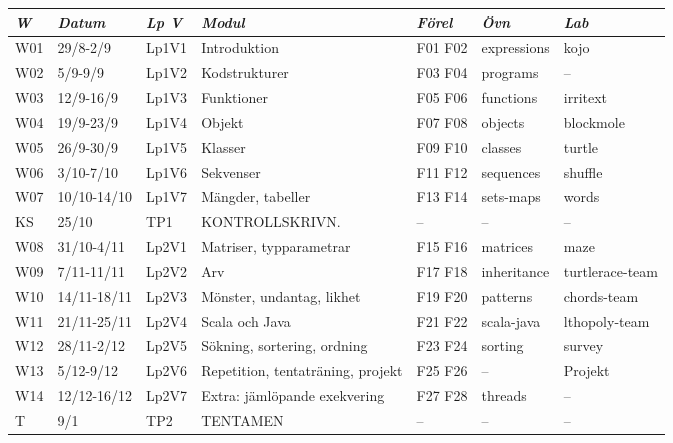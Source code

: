\begin{tabular}{l|l|l|l|l|l|l}
\textit{W} & \textit{Datum} & \textit{Lp V} & \textit{Modul} & \textit{Förel} & \textit{Övn} & \textit{Lab} \\ \hline \hline
W01 & 29/8-2/9 & Lp1V1 & Introduktion & F01 F02 & expressions & kojo \\
W02 & 5/9-9/9 & Lp1V2 & Kodstrukturer & F03 F04 & programs & -- \\
W03 & 12/9-16/9 & Lp1V3 & Funktioner & F05 F06 & functions & irritext \\
W04 & 19/9-23/9 & Lp1V4 & Objekt & F07 F08 & objects & blockmole \\
W05 & 26/9-30/9 & Lp1V5 & Klasser & F09 F10 & classes & turtle \\
W06 & 3/10-7/10 & Lp1V6 & Sekvenser & F11 F12 & sequences & shuffle \\
W07 & 10/10-14/10 & Lp1V7 & Mängder, tabeller & F13 F14 & sets-maps & words \\
KS & 25/10 & TP1 & KONTROLLSKRIVN. & -- & -- & -- \\
W08 & 31/10-4/11 & Lp2V1 & Matriser, typparametrar & F15 F16 & matrices & maze \\
W09 & 7/11-11/11 & Lp2V2 & Arv & F17 F18 & inheritance & turtlerace-team \\
W10 & 14/11-18/11 & Lp2V3 & Mönster, undantag, likhet & F19 F20 & patterns & chords-team \\
W11 & 21/11-25/11 & Lp2V4 & Scala och Java & F21 F22 & scala-java & lthopoly-team \\
W12 & 28/11-2/12 & Lp2V5 & Sökning, sortering, ordning & F23 F24 & sorting & survey \\
W13 & 5/12-9/12 & Lp2V6 & Repetition, tentaträning, projekt & F25 F26 & -- & Projekt \\
W14 & 12/12-16/12 & Lp2V7 & Extra: jämlöpande exekvering & F27 F28 & threads & -- \\
T & 9/1 & TP2 & TENTAMEN & -- & -- & -- \\
\end{tabular}
